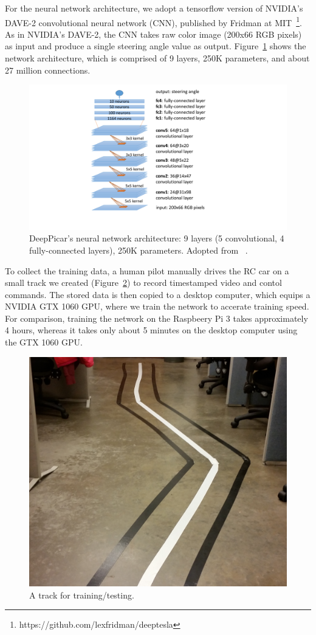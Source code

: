 For the neural network architecture, we adopt a tensorflow version of
NVIDIA's DAVE-2 convolutional neural network (CNN), published by
Fridman at  MIT~\footnote{https://github.com/lexfridman/deeptesla}. As
in NVIDIA's DAVE-2, the CNN takes raw color image (200x66 RGB pixels)
as input and produce a single steering angle value as
output. Figure~\ref{fig:architecture} shows the network architecture, which
is comprised of 9 layers, 250K parameters, and about 27 million
connections.

\begin{figure}[h]
  \centering
  \includegraphics[width=.4\textwidth]{figs/architecture}
  \caption{DeepPicar's neural network architecture: 9 layers (5
    convolutional, 4 fully-connected layers), 250K
    parameters. Adopted from ~\cite{Bojarski2016}.}
  \label{fig:architecture}
\end{figure}

To collect the training data, a human pilot manually drives the RC car
on a small track we created (Figure~\ref{fig:track}) to record
timestamped video and contol commands. The stored data is then copied 
to a desktop computer, which equips a NVIDIA GTX 1060 GPU, where we
train the network to accerate training speed. 
For comparison, training the network on the Raspbeery Pi 3 takes
approximately 4 hours, whereas it takes only about 5 minutes on the
desktop computer using the GTX 1060 GPU.

\begin{figure}[h]
  \centering
  \includegraphics[width=.4\textwidth]{figs/track_new2}
  \caption{A track for training/testing.}
  \label{fig:track}
\end{figure}


